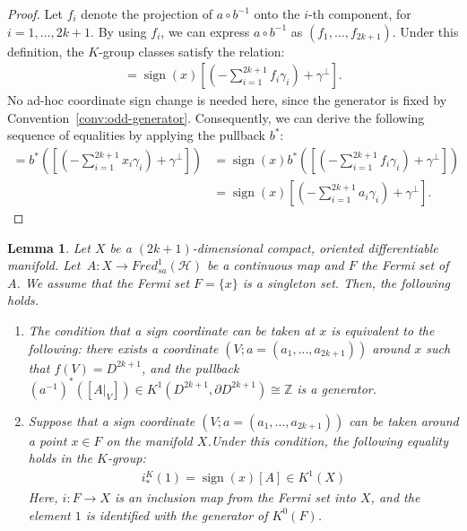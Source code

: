 \documentclass{amsart}
\newtheorem{lem}[thm]{Lemma}
\theoremstyle{definition}
\theoremstyle{remark}
\begin{document}
\begin{proof}
Let $f_i$ denote the projection of $a \circ b^{-1}$ onto the $i$-th component, for $i = 1, \dots, 2k+1$. By using $f_i$, we can express $a \circ b^{-1}$ as $(f_1, \dots, f_{2k+1})$. Under this definition, the $K$-group classes satisfy the relation:
\begin{align*}
[(-\sum_{i=1}^{2k+1}x_i\gamma_i) + \gamma^{\perp}]=\operatorname{sign}(x)[(-\sum_{i=1}^{2k+1}f_i\gamma_i) + \gamma^{\perp}].
\end{align*}
\noindent
No ad-hoc coordinate sign change is needed here, since the generator is fixed by Convention~\ref{conv:odd-generator}.
Consequently, we can derive the following sequence of equalities by applying the pullback $b^{*}$: 
\begin{align*}
[(-\sum_{i=1}^{2k+1}b_i\gamma_i) + \gamma^{\perp}]=b^{*}([(-\sum_{i=1}^{2k+1}x_i\gamma_i) + \gamma^{\perp}])&=\operatorname{sign}(x)b^{*}([(-\sum_{i=1}^{2k+1}f_i\gamma_i) + \gamma^{\perp}])\\
&=\operatorname{sign}(x)[(-\sum_{i=1}^{2k+1}a_i\gamma_i) + \gamma^{\perp}].
\end{align*} 
\end{proof}

\begin{lem}\label{lem:4.13}
Let $X$ be a $(2k+1)$-dimensional compact, oriented differentiable manifold. Let \,$A\colon X\to Fred_{sa}^1(\mathcal{H})$ be a continuous map and $F$ the Fermi set of $A$. We assume that the Fermi set $F = \{x\}$ is a singleton set. Then, the following holds.
\begin{enumerate}
\item  The condition that a sign coordinate can be taken at $x$ is equivalent to the following: there exists a coordinate $(V;a=(a_1,...,a_{2k+1}))$ around $x$ such that $f(V)=D^{2k+1}$, and the pullback $(a^{-1})^*([A|_V])\in K^1(D^{2k+1},\partial D^{2k+1})\cong \mathbb{Z}$ is a generator.\\
\item Suppose that a sign coordinate $(V;a=(a_1,...,a_{2k+1}))$ can be taken around a point $x\in F$ on the manifold $X$.Under this condition, the following equality holds in the $K$-group:
\begin{align*}
i_{*}^{K}(1)=\operatorname{sign}(x)[A] \in K^{1}(X)
\end{align*}
Here, $i:F\to X$ is an inclusion map from the Fermi set into $X$, and the element $1$ is identified with the generator of $K^0(F)$.
\end{enumerate}
\end{lem}
\end{document}
